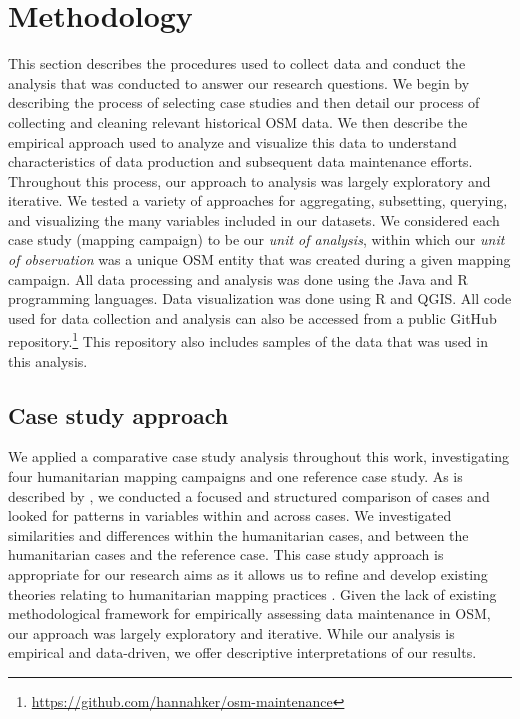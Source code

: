 \chapter{Methodology}
\label{chapterlabel4}

This section describes the procedures used to collect data and conduct the analysis that was conducted to answer our research questions. We begin by describing the process of selecting case studies and then detail our process of collecting and cleaning relevant historical OSM data. We then describe the empirical approach used to analyze and visualize this data to understand characteristics of data production and subsequent data maintenance efforts. Throughout this process, our approach to analysis was largely exploratory and iterative. We tested a variety of approaches for aggregating, subsetting, querying, and visualizing the many variables included in our datasets. We considered each case study (mapping campaign) to be our \textit{unit of analysis}, within which our \textit{unit of observation} was a unique OSM entity that was created during a given mapping campaign. All data processing and analysis was done using the Java and R programming languages. Data visualization was done using R and QGIS. All code used for data collection and analysis can also be accessed from a public GitHub repository.\footnote{\url{https://github.com/hannahker/osm-maintenance}} This repository also includes samples of the data that was used in this analysis. 

\section{Case study approach}

We applied a comparative case study analysis throughout this work, investigating four humanitarian mapping campaigns and one reference case study. As is described by \textcite{kaarbo_practical_1999}, we conducted a focused and structured comparison of cases and looked for patterns in variables within and across cases. We investigated similarities and differences within the humanitarian cases, and between the humanitarian cases and the reference case. This case study approach is appropriate for our research aims as it allows us to refine and develop existing theories relating to humanitarian mapping practices \parencite{kaarbo_practical_1999}. Given the lack of existing methodological framework for empirically assessing data maintenance in OSM, our approach was largely exploratory and iterative. While our analysis is empirical and data-driven, we offer descriptive interpretations of our results.

